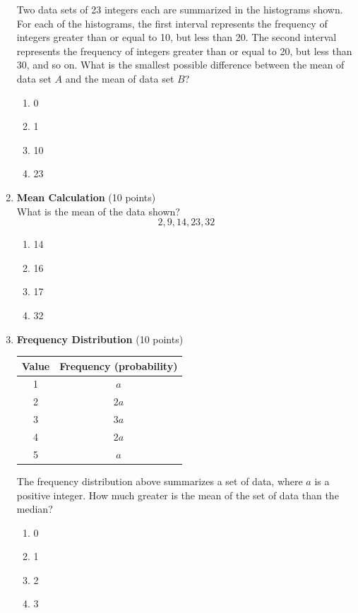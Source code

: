 \begin{enumerate}
  Two data sets of 23 integers each are summarized in the histograms shown. For each of the histograms, the first interval represents the frequency of integers greater than or equal to 10, but less than 20. The second interval represents the frequency of integers greater than or equal to 20, but less than 30, and so on. What is the smallest possible difference between the mean of data set $A$ and the mean of data set $B$?
  \begin{enumerate}[label=(\Alph*)]
    \item 0
    \item 1
    \item 10
    \item 23
  \end{enumerate}
  \begin{subanswer}
  \end{subanswer}

  \item \textbf{Mean Calculation} (10 points)\\
  What is the mean of the data shown?\\
  $$2,9,14,23,32$$
  \begin{enumerate}[label=(\Alph*)]
    \item 14
    \item 16
    \item 17
    \item 32
  \end{enumerate}
  \begin{subanswer}
  \end{subanswer}

  \newpage

  \item \textbf{Frequency Distribution} (10 points)\\
  \begin{center}
  \begin{tabular}{|c|c|}
  \hline
  Value & Frequency (probability) \\
  \hline
  1 & $a$ \\
  \hline
  2 & $2a$ \\
  \hline
  3 & $3a$ \\
  \hline
  4 & $2a$ \\
  \hline
  5 & $a$ \\
  \hline
  \end{tabular}
  \end{center}

  The frequency distribution above summarizes a set of data, where $a$ is a positive integer. How much greater is the mean of the set of data than the median?
  \begin{enumerate}[label=(\Alph*)]
    \item 0
    \item 1
    \item 2
    \item 3
  \end{enumerate}
  \begin{subanswer}
  \end{subanswer}


\end{enumerate}
